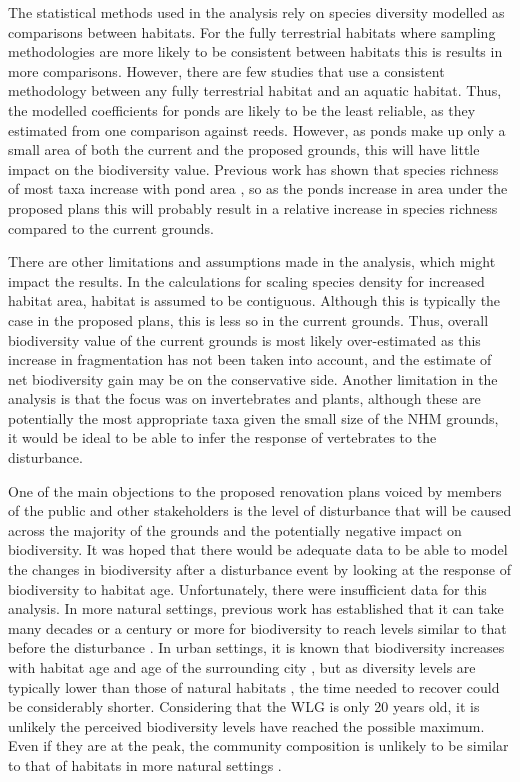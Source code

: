 The statistical methods used in the analysis rely on species diversity modelled as comparisons between habitats. For the fully terrestrial habitats where sampling methodologies are more likely to be consistent between habitats this is results in more comparisons. However, there are few studies that use a consistent methodology between any fully terrestrial habitat and an aquatic habitat. Thus, the modelled coefficients for ponds are likely to be the least reliable, as they estimated from one comparison against reeds. However, as ponds make up only a small area of both the current and the proposed grounds, this will have little impact on the biodiversity value. Previous work has shown that species richness of most taxa increase with pond area \citep{Oertli:2002bc,Parris:2006jae}, so as the ponds increase in area under the proposed plans this will probably result in a relative increase in species richness compared to the current grounds.

There are other limitations and assumptions made in the analysis, which might impact the results.  In the calculations for scaling species density for increased habitat area, habitat is assumed to be contiguous. Although this is typically the case in the proposed plans, this is less so in the current grounds. Thus, overall biodiversity value of the current grounds is most likely over-estimated as this increase in fragmentation has not been taken into account, and the estimate of net biodiversity gain may be on the conservative side.  Another limitation in the analysis is that the focus was on invertebrates and plants, although these are potentially the most appropriate taxa given the small size of the NHM grounds, it would be ideal to be able to infer the response of vertebrates to the disturbance.

One of the main objections to the proposed renovation plans voiced by members of the public and other stakeholders is the level of disturbance that will be caused across the majority of the grounds and the potentially negative impact on biodiversity. It was hoped that there would be adequate data to be able to model the changes in biodiversity after a disturbance event by looking at the response of biodiversity to habitat age. Unfortunately, there were insufficient data for this analysis.  In more natural settings, previous work has established that it can take many decades \citep{Hirst:2005jae} or a century or more \citep{Vellend:2006ecol} for biodiversity to reach levels similar to that before the disturbance . In urban settings, it is known that biodiversity increases with habitat age \citep{Yamaguchi:2004er;Sattler:2010le} and age of the surrounding city \citep{Aronson:2014procb}, but as diversity levels are typically lower than those of natural habitats \citep{Bates:2011po,Ockinger:2009lup}, the time needed to recover could be considerably shorter. Considering that the WLG is only 20 years old, it is unlikely the perceived biodiversity levels have reached the possible maximum. Even if they are at the peak, the community composition is unlikely to be similar to that of habitats in more natural settings \citep{Angold:2006ste}. 

